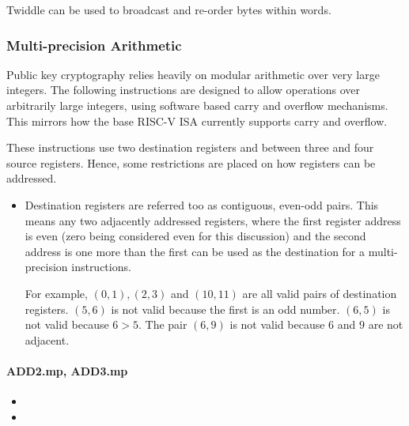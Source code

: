 Twiddle can be used to broadcast and re-order bytes within words.


\subsubsection{Multi-precision Arithmetic}

Public key cryptography relies heavily on modular arithmetic over very
large integers. The following instructions are designed to allow
operations over arbitrarily large integers, using software based carry
and overflow mechanisms. This mirrors how the base RISC-V ISA currently
supports carry and overflow.

These instructions use two destination registers and between three
and four source registers. Hence, some restrictions are placed on how
registers can be addressed.

\begin{itemize}
\item Destination registers are referred too as contiguous, even-odd
pairs. This means any two adjacently addressed registers, where the
first register address is even (zero being considered even for this
discussion) and the second address is one more than the first can be
used as the destination for a multi-precision instructions. 

For example, $(0,1), (2,3)$ and $(10,11)$ are all valid
pairs of destination registers. $(5,6)$ is not valid because the first
is an odd number. $(6,5)$ is not valid because $6 > 5$. The pair $(6,9)$
is not valid because $6$ and $9$ are not adjacent.
\end{itemize}

\paragraph{ADD2.mp, ADD3.mp}

\begin{itemize}
\item {}
\item {}
\end{itemize}

